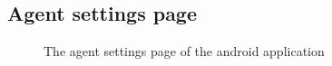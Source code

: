 \documentclass[11pt, a4paper]{article}
\begin{document}
\begin{appendices}
\subsection{Agent settings page} %
\begin{figure}[ht]
\centering
{}
\caption{The agent settings page of the android application}
\end{figure}
\clearpage



\end{appendices}
\end{document}
